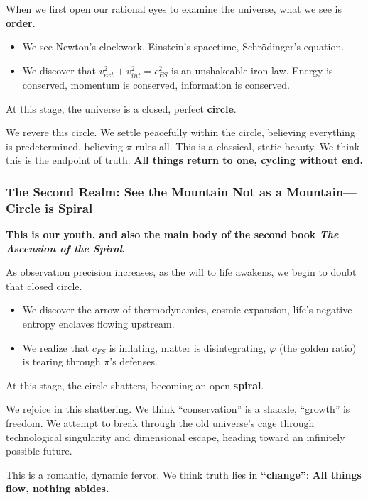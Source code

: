 When we first open our rational eyes to examine the universe, what we see is \textbf{order}.

\begin{itemize}
\item We see Newton's clockwork, Einstein's spacetime, Schrödinger's equation.

\item We discover that $v_{ext}^2 + v_{int}^2 = c_{FS}^2$ is an unshakeable iron law. Energy is conserved, momentum is conserved, information is conserved.
\end{itemize}

At this stage, the universe is a closed, perfect \textbf{circle}.

We revere this circle. We settle peacefully within the circle, believing everything is predetermined, believing $\pi$ rules all. This is a classical, static beauty. We think this is the endpoint of truth: \textbf{All things return to one, cycling without end.}

\subsubsection{The Second Realm: See the Mountain Not as a Mountain---Circle is Spiral}

\textbf{This is our youth, and also the main body of the second book \textit{The Ascension of the Spiral}.}

As observation precision increases, as the will to life awakens, we begin to doubt that closed circle.

\begin{itemize}
\item We discover the arrow of thermodynamics, cosmic expansion, life's negative entropy enclaves flowing upstream.

\item We realize that $c_{FS}$ is inflating, matter is disintegrating, $\varphi$ (the golden ratio) is tearing through $\pi$'s defenses.
\end{itemize}

At this stage, the circle shatters, becoming an open \textbf{spiral}.

We rejoice in this shattering. We think ``conservation'' is a shackle, ``growth'' is freedom. We attempt to break through the old universe's cage through technological singularity and dimensional escape, heading toward an infinitely possible future.

This is a romantic, dynamic fervor. We think truth lies in \textbf{``change''}: \textbf{All things flow, nothing abides.}


